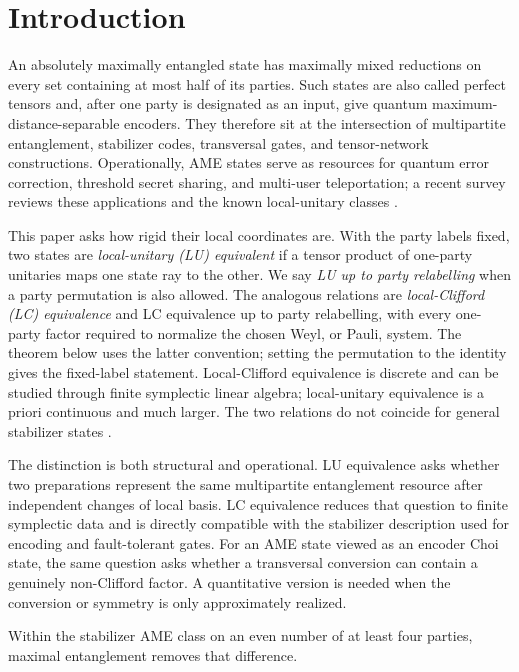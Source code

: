 \section{Introduction}

An absolutely maximally entangled state has maximally mixed reductions on
every set containing at most half of its parties.  Such states are also
called perfect tensors and, after one party is designated as an input, give
quantum maximum-distance-separable encoders.  They therefore sit at the
intersection of multipartite entanglement, stabilizer codes, transversal
gates, and tensor-network constructions.  Operationally, AME states serve as
resources for quantum error correction, threshold secret sharing, and
multi-user teleportation; a recent survey reviews these applications and
the known local-unitary classes \cite{RajchelMieldziocEtAl2026}.

This paper asks how rigid their local coordinates are.  With the party labels
fixed, two states are \emph{local-unitary (LU) equivalent} if a tensor product
of one-party unitaries maps one state ray to the other.  We say \emph{LU up to
party relabelling} when a party permutation is also allowed.  The analogous
relations are \emph{local-Clifford (LC) equivalence} and LC equivalence up to
party relabelling, with every one-party factor required to normalize the
chosen Weyl, or Pauli, system.  The theorem below uses the latter convention;
setting the permutation to the identity gives the fixed-label statement.
Local-Clifford equivalence is
discrete and can be studied through finite symplectic linear algebra;
local-unitary equivalence is a priori continuous and much larger.  The two
relations do not coincide for general stabilizer states
\cite{JiChenWeiYing2008}.

The distinction is both structural and operational.  LU equivalence asks
whether two preparations represent the same multipartite entanglement
resource after independent changes of local basis.  LC equivalence reduces
that question to finite symplectic data and is directly compatible with the
stabilizer description used for encoding and fault-tolerant gates.  For an
AME state viewed as an encoder Choi state, the same question asks whether a
transversal conversion can contain a genuinely non-Clifford factor.  A
quantitative version is needed when the conversion or symmetry is only
approximately realized.

Within the stabilizer AME class on an even number of at least four parties, maximal
entanglement removes that difference.

